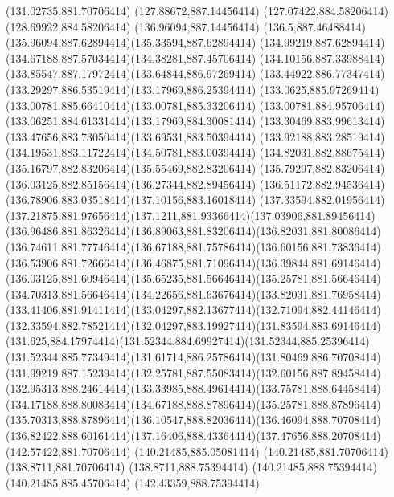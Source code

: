{{	\lineto(131.02735,881.70706414)
	\closepath
	\moveto(127.88672,887.14456414)
	\lineto(127.07422,884.58206414)
	\lineto(128.69922,884.58206414)
	\closepath
	\moveto(136.96094,887.14456414)
	\curveto(136.5,887.46488414)(135.96094,887.62894414)(135.33594,887.62894414)
	\curveto(134.99219,887.62894414)(134.67188,887.57034414)(134.38281,887.45706414)
	\curveto(134.10156,887.33988414)(133.85547,887.17972414)(133.64844,886.97269414)
	\curveto(133.44922,886.77347414)(133.29297,886.53519414)(133.17969,886.25394414)
	\curveto(133.0625,885.97269414)(133.00781,885.66410414)(133.00781,885.33206414)
	\curveto(133.00781,884.95706414)(133.06251,884.61331414)(133.17969,884.30081414)
	\curveto(133.30469,883.99613414)(133.47656,883.73050414)(133.69531,883.50394414)
	\curveto(133.92188,883.28519414)(134.19531,883.11722414)(134.50781,883.00394414)
	\curveto(134.82031,882.88675414)(135.16797,882.83206414)(135.55469,882.83206414)
	\curveto(135.79297,882.83206414)(136.03125,882.85156414)(136.27344,882.89456414)
	\curveto(136.51172,882.94536414)(136.78906,883.03518414)(137.10156,883.16018414)
	\lineto(137.33594,882.01956414)
	\curveto(137.21875,881.97656414)(137.1211,881.93366414)(137.03906,881.89456414)
	\curveto(136.96486,881.86326414)(136.89063,881.83206414)(136.82031,881.80086414)
	\curveto(136.74611,881.77746414)(136.67188,881.75786414)(136.60156,881.73836414)
	\curveto(136.53906,881.72666414)(136.46875,881.71096414)(136.39844,881.69146414)
	\curveto(136.03125,881.60946414)(135.65235,881.56646414)(135.25781,881.56646414)
	\curveto(134.70313,881.56646414)(134.22656,881.63676414)(133.82031,881.76958414)
	\curveto(133.41406,881.91411414)(133.04297,882.13677414)(132.71094,882.44146414)
	\curveto(132.33594,882.78521414)(132.04297,883.19927414)(131.83594,883.69146414)
	\curveto(131.625,884.17974414)(131.52344,884.69927414)(131.52344,885.25396414)
	\curveto(131.52344,885.77349414)(131.61714,886.25786414)(131.80469,886.70708414)
	\curveto(131.99219,887.15239414)(132.25781,887.55083414)(132.60156,887.89458414)
	\curveto(132.95313,888.24614414)(133.33985,888.49614414)(133.75781,888.64458414)
	\curveto(134.17188,888.80083414)(134.67188,888.87896414)(135.25781,888.87896414)
	\curveto(135.70313,888.87896414)(136.10547,888.82036414)(136.46094,888.70708414)
	\curveto(136.82422,888.60161414)(137.16406,888.43364414)(137.47656,888.20708414)
	\closepath
	\moveto(142.57422,881.70706414)
	\lineto(140.21485,885.05081414)
	\lineto(140.21485,881.70706414)
	\lineto(138.8711,881.70706414)
	\lineto(138.8711,888.75394414)
	\lineto(140.21485,888.75394414)
	\lineto(140.21485,885.45706414)
	\lineto(142.43359,888.75394414)
}}
